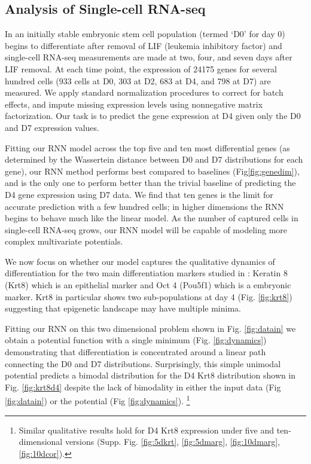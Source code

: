 \documentclass{article}
\begin{document}
\subsection{Analysis of Single-cell RNA-seq}

In \citep{klein2015droplet} an initially stable embryonic stem cell population (termed `D0' for day 0) begins to differentiate after removal of LIF (leukemia inhibitory factor) and single-cell RNA-seq measurements are made at two, four, and seven days after LIF removal. At each time point, the expression of 24175 genes for several hundred cells (933 cells at D0, 303 at D2, 683 at D4, and 798 at D7) are measured. We apply standard normalization procedures \citep{hicks2015widespread} to correct for batch effects, and impute missing expression levels using nonnegative matrix factorization. Our task is to predict the gene expression at D4 given only the D0 and D7 expression values.

Fitting our RNN model across the top five and ten most differential genes (as determined by the Wassertein distance between D0 and D7 distributions for each gene), our RNN method performs best compared to baselines (Fig\ref{fig:genedim}), and is the only one to perform better than the trivial baseline of predicting the D4 gene expression using D7 data. We find that ten genes is the limit for accurate prediction with a few hundred cells; in higher dimensions the RNN begins to behave much like the linear model. As the number of captured cells in single-cell RNA-seq grows, our RNN model will be capable of modeling more complex multivariate potentials.

We now focus on whether our model captures the qualitative dynamics of differentiation for the two main differentiation markers studied in \citep{klein2015droplet}: Keratin 8 (Krt8) which is an epithelial marker and Oct 4 (Pou5f1) which is a embryonic marker. Krt8 in particular shows two sub-populations at day 4 (Fig. \ref{fig:krt8}) suggesting that epigenetic landscape may have multiple minima.

Fitting our RNN on this two dimensional problem shown in Fig. \ref{fig:datain} we obtain a potential function with a single minimum (Fig. \ref{fig:dynamics}) demonstrating that differentiation is concentrated around a linear path connecting the D0 and D7 distributions. Surprisingly, this simple unimodal potential predicts a bimodal distribution for the D4 Krt8 distribution shown in Fig. \ref{fig:krt8d4} despite the lack of bimodality in either the input data (Fig \ref{fig:datain}) or the potential (Fig \ref{fig:dynamics}). \footnote{Similar qualitative results hold for D4 Krt8 expression under five and ten-dimensional versions (Supp. Fig. \ref{fig:5dkrt}, \ref{fig:5dmarg}, \ref{fig:10dmarg}, \ref{fig:10dcor}).}
\end{document}
